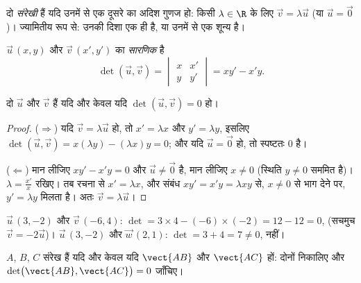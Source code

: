 \begin{definition}[संरेखी सदिश]\label{def:g11:vect:collinear}
दो  \emph{संरेखी} हैं यदि उनमें से एक दूसरे का अदिश
गुणज हो: किसी $\lambda \in \R$ के लिए $\vec v = \lambda \vec u$ (या $\vec u = \vec 0$)। ज्यामितीय रूप से: उनकी दिशा एक ही
है, या उनमें से एक शून्य है।
\end{definition}

\begin{definition}[सारणिक]\label{def:g11:vect:det}
$\vec u\,(x, y)$ और $\vec v\,(x', y')$ का \emph{सारणिक} है
\[
\det(\vec u, \vec v) =
\begin{vmatrix} x & x' \\ y & y' \end{vmatrix}
= x y' - x' y .
\]
\end{definition}

\begin{theorem}[संरेखता की कसौटी]\label{thm:g11:vect:collinearity}
दो  $\vec u$ और $\vec v$  हैं यदि और केवल यदि $\det(\vec u, \vec v) = 0$ हो।
\end{theorem}

\begin{proof}
($\Rightarrow$) यदि $\vec v = \lambda\vec u$ हो, तो $x' = \lambda x$ और $y' = \lambda y$, इसलिए $\det(\vec u, \vec v) = x(\lambda y) - (\lambda x)y = 0$; और यदि $\vec u = \vec 0$ हो, तो 
स्पष्टतः $0$ है।

($\Leftarrow$) मान लीजिए $xy' - x'y = 0$ और $\vec u \neq \vec 0$ है, मान लीजिए $x \neq 0$ (स्थिति $y \neq 0$ सममित है)।
$\lambda = \frac{x'}{x}$ रखिए। तब रचना से $x' = \lambda x$, और संबंध $xy' = x'y = \lambda x y$ से, $x \neq 0$ से भाग देने पर, $y' = \lambda y$
मिलता है। अतः $\vec v = \lambda \vec u$।
\end{proof}

\begin{example}\label{ex:g11:vect:collinear}
$\vec u\,(3, -2)$ और $\vec v\,(-6, 4)$: $\det = 3 \times 4 - (-6) \times (-2) = 12 - 12 = 0$,  (सचमुच $\vec v = -2\vec u$)। $\vec u\,(3, -2)$ और $\vec w\,(2, 1)$: $\det = 3 + 4 = 7 \neq 0$,  नहीं।
\end{example}

\begin{method}[तीन बिंदुओं का संरेखण]\label{met:g11:vect:alignment}
$A$, $B$, $C$ संरेख हैं यदि और केवल यदि $\vect{AB}$ और $\vect{AC}$  हों: दोनों
 निकालिए और $\det\bigl(\vect{AB}, \vect{AC}\bigr) = 0$ जाँचिए।
\end{method}

